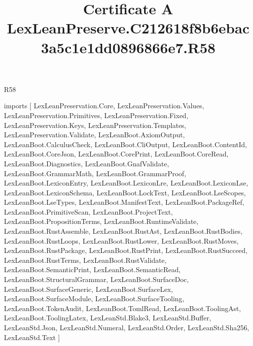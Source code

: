 \begin{lexlean}{R58}
\title{Certificate A LexLeanPreserve.C212618f8b6ebac3a5c1e1dd0896866e7.R58}
\begin{coremodule}
imports [
  LexLeanPreservation.Core,
  LexLeanPreservation.Values,
  LexLeanPreservation.Primitives,
  LexLeanPreservation.Fixed,
  LexLeanPreservation.Keys,
  LexLeanPreservation.Templates,
  LexLeanPreservation.Validate,
  LexLeanBoot.AxiomOutput,
  LexLeanBoot.CalculusCheck,
  LexLeanBoot.CliOutput,
  LexLeanBoot.ContentId,
  LexLeanBoot.CoreJson,
  LexLeanBoot.CorePrint,
  LexLeanBoot.CoreRead,
  LexLeanBoot.Diagnostics,
  LexLeanBoot.GnafValidate,
  LexLeanBoot.GrammarMath,
  LexLeanBoot.GrammarProof,
  LexLeanBoot.LexiconEntry,
  LexLeanBoot.LexiconLre,
  LexLeanBoot.LexiconLse,
  LexLeanBoot.LexiconSchema,
  LexLeanBoot.LockText,
  LexLeanBoot.LseScopes,
  LexLeanBoot.LseTypes,
  LexLeanBoot.ManifestText,
  LexLeanBoot.PackageRef,
  LexLeanBoot.PrimitiveScan,
  LexLeanBoot.ProjectText,
  LexLeanBoot.PropositionTerms,
  LexLeanBoot.RuntimeValidate,
  LexLeanBoot.RustAssemble,
  LexLeanBoot.RustAst,
  LexLeanBoot.RustBodies,
  LexLeanBoot.RustLoops,
  LexLeanBoot.RustLower,
  LexLeanBoot.RustMoves,
  LexLeanBoot.RustPackage,
  LexLeanBoot.RustPrint,
  LexLeanBoot.RustSucceed,
  LexLeanBoot.RustTerms,
  LexLeanBoot.RustValidate,
  LexLeanBoot.SemanticPrint,
  LexLeanBoot.SemanticRead,
  LexLeanBoot.StructuralGrammar,
  LexLeanBoot.SurfaceDoc,
  LexLeanBoot.SurfaceGeneric,
  LexLeanBoot.SurfaceLex,
  LexLeanBoot.SurfaceModule,
  LexLeanBoot.SurfaceTooling,
  LexLeanBoot.TokenAudit,
  LexLeanBoot.TomlRead,
  LexLeanBoot.ToolingAst,
  LexLeanBoot.ToolingLatex,
  LexLeanStd.Blake3,
  LexLeanStd.Buffer,
  LexLeanStd.Json,
  LexLeanStd.Numeral,
  LexLeanStd.Order,
  LexLeanStd.Sha256,
  LexLeanStd.Text
]


\end{coremodule}
\end{lexlean}
